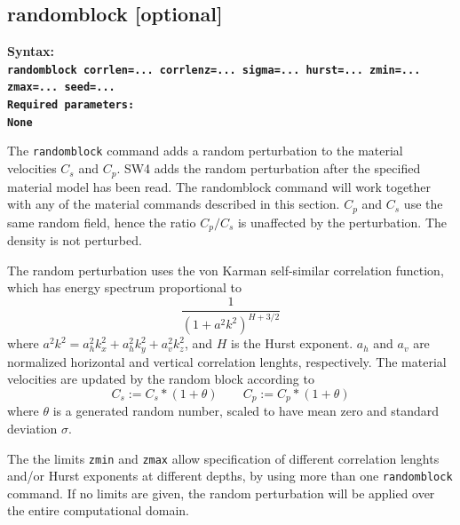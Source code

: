 \documentclass[11pt]{report}
\begin{document}
{%

\subsection{randomblock [optional]}
\label{keyword:randomblock}
\begin{flushleft}\bf
	Syntax:\\
	\tt randomblock corrlen=... corrlenz=... sigma=... hurst=... zmin=... zmax=... seed=...  \\
	\bf Required parameters:\\
	\rm None
\end{flushleft}
The {\tt randomblock} command adds a random perturbation to the material velocities $C_s$ and $C_p$. SW4 adds the random
perturbation after the specified material model has been read. The randomblock command will work together with any of
the material commands described in this section.
$C_p$ and $C_s$ use the same random field, hence the ratio $C_p/C_s$ is
unaffected by the perturbation. The density is not perturbed. \par
The random perturbation uses the von Karman self-similar correlation function, which has energy spectrum
proportional to
$$
	\frac{1}{(1+a^2k^2)^{H+3/2}}
$$
where $a^2k^2=a_h^2k_x^2+a_h^2k_y^2+a_v^2k_z^2$, and $H$ is the Hurst exponent. $a_h$ and $a_v$ are normalized
horizontal and vertical correlation lenghts, respectively.
The material velocities are updated by the random block according to
$$
	C_s := C_s*(1+\theta)\qquad  C_p := C_p*(1+\theta)
$$
where $\theta$ is a generated random number, scaled to have mean zero and standard deviation $\sigma$. \par
The the limits {\tt zmin} and {\tt zmax} allow specification of different correlation lenghts and/or Hurst exponents
at different depths, by using more than one {\tt randomblock} command. If no limits are given, the random perturbation
will be applied over the entire computational domain.

}
\end{document}
